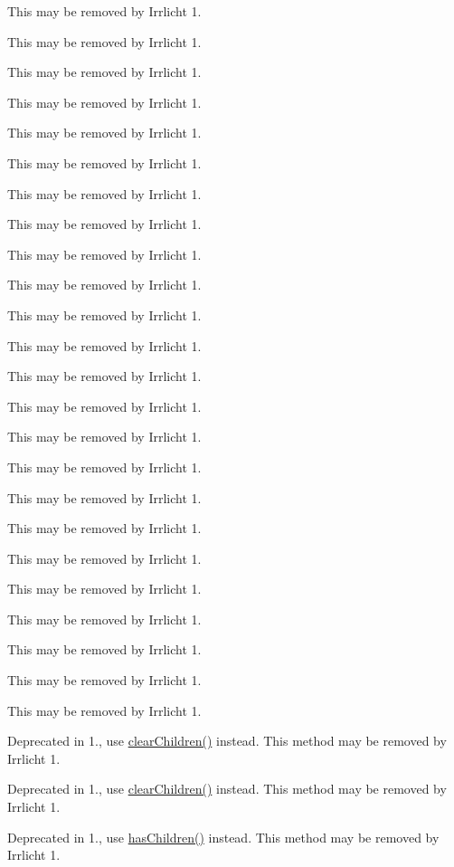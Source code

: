 \begin{DoxyRefList}
This may be removed by Irrlicht 1. 

This may be removed by Irrlicht 1. 

This may be removed by Irrlicht 1. 

This may be removed by Irrlicht 1. 

This may be removed by Irrlicht 1. 

This may be removed by Irrlicht 1. 

This may be removed by Irrlicht 1. 

This may be removed by Irrlicht 1. 

This may be removed by Irrlicht 1. 

This may be removed by Irrlicht 1. 

This may be removed by Irrlicht 1. 

This may be removed by Irrlicht 1. 

This may be removed by Irrlicht 1. 

This may be removed by Irrlicht 1. 

This may be removed by Irrlicht 1. 

This may be removed by Irrlicht 1. 

This may be removed by Irrlicht 1. 

This may be removed by Irrlicht 1. 

This may be removed by Irrlicht 1. 

This may be removed by Irrlicht 1. 

This may be removed by Irrlicht 1. 

This may be removed by Irrlicht 1. 

This may be removed by Irrlicht 1. 

This may be removed by Irrlicht 1.  
\item[\label{deprecated__deprecated000007}%
\Hypertarget{deprecated__deprecated000007}%
Member \hyperlink{classirr_1_1gui_1_1IGUITreeViewNode_a6c431404c8e36eb565f033c1e1dce247}{irr\+:\+:gui\+:\+:I\+G\+U\+I\+Tree\+View\+Node\+:\+:clear\+Childs} ()]Deprecated in 1., use \hyperlink{classirr_1_1gui_1_1IGUITreeViewNode_a0bc4702930d1ddb25b895c7176f5f459}{clear\+Children()} instead. This method may be removed by Irrlicht 1. 

Deprecated in 1., use \hyperlink{classirr_1_1gui_1_1IGUITreeViewNode_a0bc4702930d1ddb25b895c7176f5f459}{clear\+Children()} instead. This method may be removed by Irrlicht 1.  
\item[\label{deprecated__deprecated000008}%
\Hypertarget{deprecated__deprecated000008}%
Member \hyperlink{classirr_1_1gui_1_1IGUITreeViewNode_a7a771fc86d39a62487184bc56bcf8c52}{irr\+:\+:gui\+:\+:I\+G\+U\+I\+Tree\+View\+Node\+:\+:has\+Childs} () const]Deprecated in 1., use \hyperlink{classirr_1_1gui_1_1IGUITreeViewNode_a64244b92443fefbd06c910daf5db3c5f}{has\+Children()} instead. This method may be removed by Irrlicht 1. 


\end{DoxyRefList}
